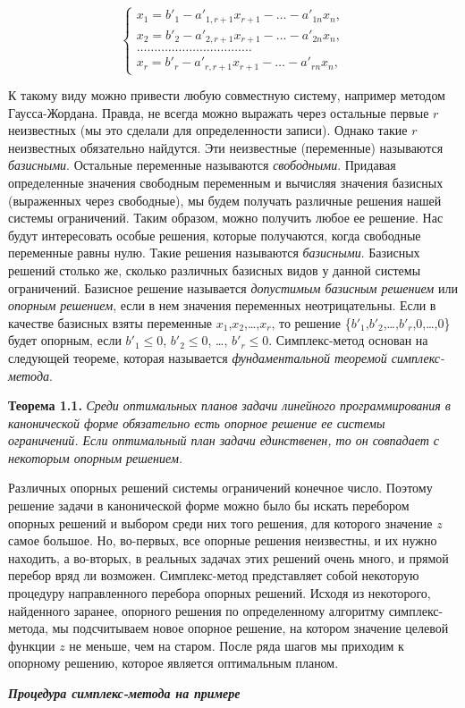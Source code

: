\documentclass{article}
\begin{document}
\begin{equation*}
\begin{cases}
x_1 = b'_1 - a'_{1,r+1}x_{r+1} - \dots - a'_{1n}x_n,\\
x_2 = b'_2 - a'_{2,r+1}x_{r+1} - \dots - a'_{2n}x_n,\\
\dots\dots\dots\dots\dots\dots\dots\dots\dots\dots\dots\\
x_r = b'_r - a'_{r,r+1}x_{r+1} - \dots - a'_{rn}x_n,
\end{cases}
\end{equation*}

К такому виду можно привести любую совместную систему, например методом Гаусса-Жордана. Правда, не всегда можно выражать через остальные первые $r$ неизвестных (мы это сделали для определенности записи). Однако такие $r$ неизвестных обязательно найдутся. Эти неизвестные (переменные) называются \textit{базисными}. Остальные переменные называются   \textit{свободными}. Придавая определенные значения свободным переменным и вычисляя значения базисных (выраженных через свободные), мы будем получать различные решения нашей системы ограничений. Таким образом, можно получить любое ее решение. Нас будут интересовать особые решения, которые  получаются, когда свободные переменные равны нулю. Такие решения  называются \textit{базисными}. Базисных решений столько же, сколько  различных  базисных видов у данной системы ограничений. Базисное решение называется \textit{допустимым базисным решением} или \textit{опорным решением}, если в нем значения переменных неотрицательны. Если в качестве базисных взяты переменные $x_1$,$x_2$,\dots,$x_r$, то решение \{$b'_1$,$b'_2$,\dots,$b'_r$,0,\dots,0\} будет опорным, если $b'_1 \leq 0$,    $b'_2 \leq 0$, \dots, $b'_r \leq 0$. Симплекс-метод основан на следующей теореме, которая называется \textit{фундаментальной теоремой симплекс-метода}. 

\textbf{Теорема 1.1.} \textit{Среди оптимальных планов задачи линейного программирования в канонической форме обязательно есть опорное решение ее системы ограничений. Если оптимальный план задачи единственен, то он совпадает с некоторым опорным  решением.}

Различных опорных решений системы ограничений конечное число. Поэтому решение задачи в канонической форме можно было бы искать  перебором опорных решений и выбором среди них того решения,  для  которого  значение $z$ самое большое. Но, во-первых, все опорные решения неизвестны, и их нужно находить, а во-вторых, в реальных задачах этих решений очень много, и прямой перебор вряд ли возможен. Симплекс-метод  представляет собой  некоторую  процедуру  направленного перебора опорных решений.  Исходя из некоторого, найденного заранее, опорного решения по определенному алгоритму симплекс-метода, мы подсчитываем новое опорное решение, на котором значение целевой функции $z$ не меньше, чем на старом. После ряда шагов мы приходим к опорному решению, которое является  оптимальным планом.
\begin{center}
\textit{\textbf{Процедура симплекс-метода на примере}}
\end{center}
\end{document}

